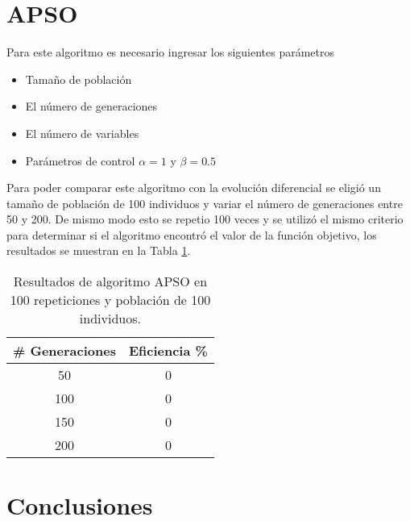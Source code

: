 \documentclass[conference]{IEEEtran}
\begin{document}
\section{APSO}

Para este algoritmo es necesario ingresar los siguientes parámetros
\begin{itemize}
\item Tamaño de población
\item El número de generaciones
\item El número de variables
\item Parámetros de control $\alpha = 1$ y $\beta = 0.5$
\end{itemize}

Para poder comparar este algoritmo con la evolución diferencial se eligió un tamaño de población de 100 individuos y variar el número de generaciones  entre 50 y 200. De mismo modo esto se repetio 100 veces y se utilizó el mismo criterio  para determinar si el algoritmo encontró el valor de la función objetivo, los resultados se muestran en la Tabla \ref{tab:APSO}.


\begin{table}[h!]   
	\caption{Resultados de algoritmo APSO en 100 repeticiones y población de 100 individuos.}                                                                                                                
		\centering                                       
		\begin{tabular}{cc}
			\hline                                             
			\#{} Generaciones & Eficiencia \% \\                     
			\hline 
			50 & 0\\                                            
			100 & 0\\
			150 & 0\\
			200 & 0\\
			\hline                                             
		\end{tabular}
		\label{tab:APSO}
	\end{table}	

\section{Conclusiones}
\end{document}
